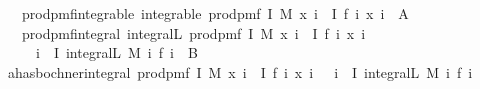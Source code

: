 \begin{isabellebody}
\ \ \ prod{\isacharunderscore}{\kern0pt}pmf{\isacharunderscore}{\kern0pt}integrable{\isacharcolon}{\kern0pt}\ {\isachardoublequoteopen}integrable\ {\isacharparenleft}{\kern0pt}prod{\isacharunderscore}{\kern0pt}pmf\ I\ M{\isacharparenright}{\kern0pt}\ {\isacharparenleft}{\kern0pt}{\isasymlambda}x{\isachardot}{\kern0pt}\ {\isacharparenleft}{\kern0pt}{\isasymProd}i\ {\isasymin}\ I{\isachardot}{\kern0pt}\ f\ i\ {\isacharparenleft}{\kern0pt}x\ i{\isacharparenright}{\kern0pt}{\isacharparenright}{\kern0pt}{\isacharparenright}{\kern0pt}{\isachardoublequoteclose}\ {\isacharparenleft}{\kern0pt}\ {\isacharquery}{\kern0pt}A{\isacharparenright}{\kern0pt}\ \isanewline
\ \ \ prod{\isacharunderscore}{\kern0pt}pmf{\isacharunderscore}{\kern0pt}integral{\isacharcolon}{\kern0pt}\ {\isachardoublequoteopen}integral\isactrlsup L\ {\isacharparenleft}{\kern0pt}prod{\isacharunderscore}{\kern0pt}pmf\ I\ M{\isacharparenright}{\kern0pt}\ {\isacharparenleft}{\kern0pt}{\isasymlambda}x{\isachardot}{\kern0pt}\ {\isacharparenleft}{\kern0pt}{\isasymProd}i\ {\isasymin}\ I{\isachardot}{\kern0pt}\ f\ i\ {\isacharparenleft}{\kern0pt}x\ i{\isacharparenright}{\kern0pt}{\isacharparenright}{\kern0pt}{\isacharparenright}{\kern0pt}\ {\isacharequal}{\kern0pt}\ \isanewline
\ \ \ \ {\isacharparenleft}{\kern0pt}{\isasymProd}\ i\ {\isasymin}\ I{\isachardot}{\kern0pt}\ integral\isactrlsup L\ {\isacharparenleft}{\kern0pt}M\ i{\isacharparenright}{\kern0pt}\ {\isacharparenleft}{\kern0pt}f\ i{\isacharparenright}{\kern0pt}{\isacharparenright}{\kern0pt}{\isachardoublequoteclose}\ {\isacharparenleft}{\kern0pt}\ {\isacharquery}{\kern0pt}B{\isacharparenright}{\kern0pt}\isanewline
%
\isadelimproof
%
\endisadelimproof
%
\isatagproof
{}\isamarkupfalse%
\ {\isacharminus}{\kern0pt}\isanewline
\ \ \isamarkupfalse%
\ a{\isacharcolon}{\kern0pt}{\isachardoublequoteopen}has{\isacharunderscore}{\kern0pt}bochner{\isacharunderscore}{\kern0pt}integral\ {\isacharparenleft}{\kern0pt}prod{\isacharunderscore}{\kern0pt}pmf\ I\ M{\isacharparenright}{\kern0pt}\ {\isacharparenleft}{\kern0pt}{\isasymlambda}x{\isachardot}{\kern0pt}\ {\isacharparenleft}{\kern0pt}{\isasymProd}i\ {\isasymin}\ I{\isachardot}{\kern0pt}\ f\ i\ {\isacharparenleft}{\kern0pt}x\ i{\isacharparenright}{\kern0pt}{\isacharparenright}{\kern0pt}{\isacharparenright}{\kern0pt}\ \ {\isacharparenleft}{\kern0pt}{\isasymProd}\ i\ {\isasymin}\ I{\isachardot}{\kern0pt}\ integral\isactrlsup L\ {\isacharparenleft}{\kern0pt}M\ i{\isacharparenright}{\kern0pt}\ {\isacharparenleft}{\kern0pt}f\ i{\isacharparenright}{\kern0pt}{\isacharparenright}{\kern0pt}{\isachardoublequoteclose}\isanewline

\end{isabellebody}
